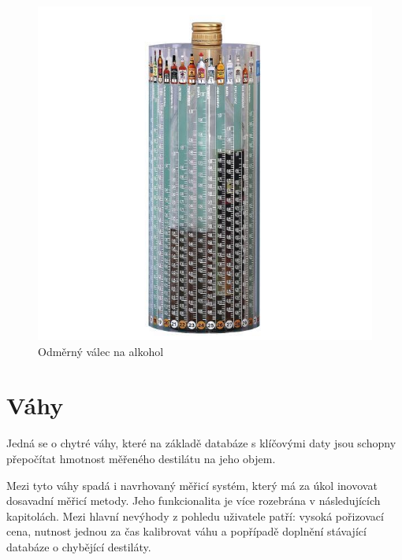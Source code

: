 \begin{figure}[!h]
    \begin{center}
        \includegraphics[scale=0.35]{obrazky/odměrný válec na alkohol.jpg}
    \end{center}
    \caption{Odměrný válec na alkohol \cite{Odměrný válec na alkohol}}
\end{figure}


\section{Váhy}

Jedná se o chytré váhy, které na základě databáze s klíčovými daty jsou schopny přepočítat hmotnost měřeného destilátu na jeho objem. 

Mezi tyto váhy spadá i navrhovaný měřicí systém, který má za úkol inovovat dosavadní měřicí metody. Jeho funkcionalita je více rozebrána v následujících kapitolách. Mezi hlavní nevýhody z pohledu uživatele patří: vysoká pořizovací cena, nutnost jednou za čas kalibrovat váhu a popřípadě doplnění stávající databáze o chybějící destiláty.

